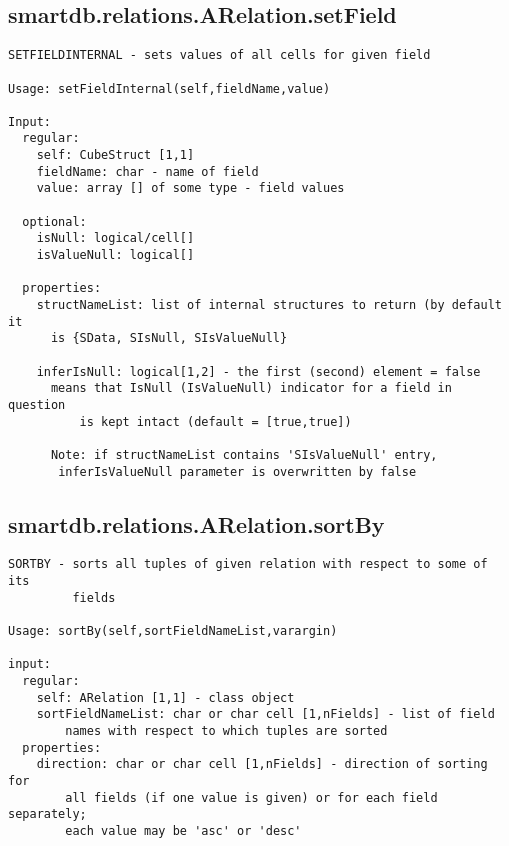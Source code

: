 \subsection{\texorpdfstring{smartdb.relations.ARelation.setField}{setField}}\label{method:smartdb.relations.ARelation.setField}
\begin{verbatim}
SETFIELDINTERNAL - sets values of all cells for given field

Usage: setFieldInternal(self,fieldName,value)

Input:
  regular:
    self: CubeStruct [1,1]
    fieldName: char - name of field
    value: array [] of some type - field values

  optional:
    isNull: logical/cell[]
    isValueNull: logical[]

  properties:
    structNameList: list of internal structures to return (by default it
      is {SData, SIsNull, SIsValueNull}

    inferIsNull: logical[1,2] - the first (second) element = false
      means that IsNull (IsValueNull) indicator for a field in question
          is kept intact (default = [true,true])

      Note: if structNameList contains 'SIsValueNull' entry,
       inferIsValueNull parameter is overwritten by false
\end{verbatim}
\subsection{\texorpdfstring{smartdb.relations.ARelation.sortBy}{sortBy}}\label{method:smartdb.relations.ARelation.sortBy}
\begin{verbatim}
SORTBY - sorts all tuples of given relation with respect to some of its
         fields

Usage: sortBy(self,sortFieldNameList,varargin)

input:
  regular:
    self: ARelation [1,1] - class object
    sortFieldNameList: char or char cell [1,nFields] - list of field
        names with respect to which tuples are sorted
  properties:
    direction: char or char cell [1,nFields] - direction of sorting for
        all fields (if one value is given) or for each field separately;
        each value may be 'asc' or 'desc'
\end{verbatim}
